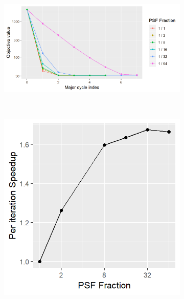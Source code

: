 \begin{figure}[h]
	\centering
	\begin{subfigure}[b]{0.7\linewidth}
		\includegraphics[width=\linewidth]{./chapters/10.results/gradient/ApproxDeconv/size.png}
	\end{subfigure}
	\\
	\begin{subfigure}[b]{0.35\linewidth}
		\includegraphics[width=\linewidth]{./chapters/10.results/gradient/ApproxDeconv/speedup_iter.png}
	\end{subfigure}
	\begin{subfigure}[b]{0.35\linewidth}

\end{subfigure}
\end{figure}
